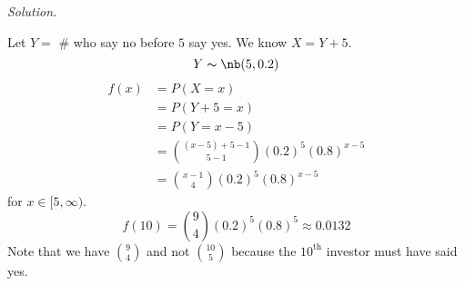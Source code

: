 \emph{Solution.}

Let $ Y= $ \# who say no before $ 5 $ say yes. We know $ X=Y+5 $.
\[ Y\thicksim\nb(5,0.2) \]
\begin{align*}
    f(x)&=P(X=x)\\
    &=P(Y+5=x)\\
    &=P(Y=x-5)\\
    &=\binom{(x-5)+5-1}{5-1}(0.2)^5(0.8)^{x-5}\\
    &=\binom{x-1}{4}(0.2)^5(0.8)^{x-5}
\end{align*}
for $ x\in[5,\infty) $.
\[ f(10)=\binom{9}{4}(0.2)^5(0.8)^5\approx 0.0132\]
Note that we have $ \binom{9}{4} $ and not $ \binom{10}{5} $ because
the $10^{\text{th}}$ investor must have said yes.